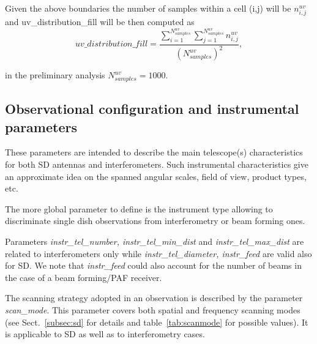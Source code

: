 \documentclass[11pt,a4paper]{ivoa}
\begin{document}
Given the above boundaries the number of samples within a cell (i,j) will be $n^{uv}_{i,j}$
and uv\_distribution\_fill will be then computed as
\begin{equation}
uv\_distribution\_fill = \frac{\sum^{N^{uv}_{samples}}_{i=1} \sum^{N^{uv}_{samples}}_{j=1}
n^{uv}_{i,j} }{(N^{uv}_{samples}) ^ 2},
\end{equation}

in the preliminary analysis $N^{uv}_{samples} = 1000$.




\subsection{Observational configuration and instrumental parameters}
These parameters are intended to describe the main telescope(s) characteristics for both SD antennas and interferometers. 
Such instrumental characteristics give an approximate idea on the spanned angular scales, field of view, product types, etc.

The more global parameter to define is the instrument type allowing to discriminate single dish observations from interferometry or beam forming ones.

Parameters \emph{instr\_tel\_number, instr\_tel\_min\_dist} and  \emph{instr\_tel\_max\_dist} are related to interferometers only while 
\emph{instr\_tel\_diameter, instr\_feed } are valid also for SD.
We note that \emph{instr\_feed} could also  account for the number of beams in the case of a beam forming/PAF receiver.

The scanning strategy adopted in an observation is described by the parameter \emph{scan\_mode}. This parameter covers both spatial
and frequency scanning modes (see Sect.~\ref{subsec:sd} for details and table~\ref{tab:scanmode} for possible values).
It is applicable to  SD as well as to interferometry cases.
\end{document}
